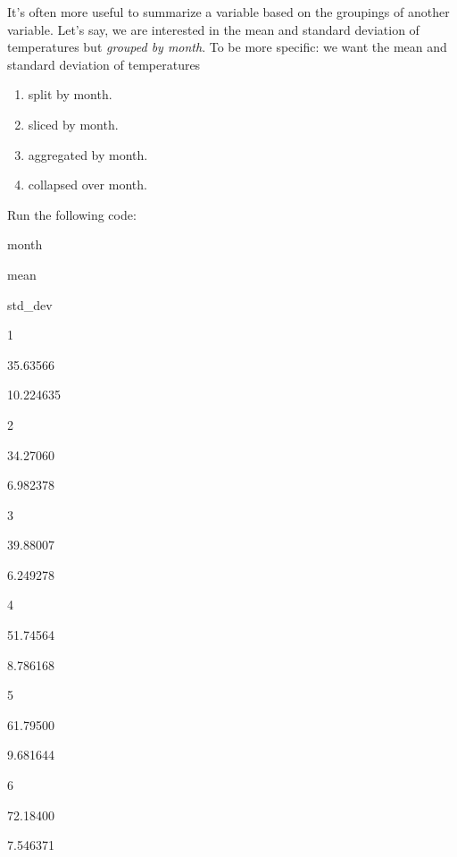 \documentclass[12pt,]{krantz}
\makeatletter
\newenvironment{Shaded}{\begin{snugshade}}{\end{snugshade}}
\newcommand{\KeywordTok}[1]{\textcolor[rgb]{0.27,0.27,0.27}{\textbf{#1}}}
\newcommand{\DataTypeTok}[1]{\textcolor[rgb]{0.27,0.27,0.27}{#1}}
\newcommand{\StringTok}[1]{\textcolor[rgb]{0.5,0.5,0.5}{#1}}
\newcommand{\OtherTok}[1]{\textcolor[rgb]{0.37,0.37,0.37}{#1}}
\newcommand{\OperatorTok}[1]{\textcolor[rgb]{0.43,0.43,0.43}{\textbf{#1}}}
\newcommand{\NormalTok}[1]{#1}
\providecommand{\tightlist}{%
  \setlength{\itemsep}{0pt}\setlength{\parskip}{0pt}}
\newenvironment{kframe}{%
\medskip{}
\setlength{\fboxsep}{.8em}
 \def\at@end@of@kframe{}%
 \ifinner\ifhmode%
  \def\at@end@of@kframe{\end{minipage}}%
  \begin{minipage}{\columnwidth}%
 \fi\fi%
 \def\FrameCommand##1{\hskip\@totalleftmargin \hskip-\fboxsep
 \colorbox{shadecolor}{##1}\hskip-\fboxsep
     \hskip-\linewidth \hskip-\@totalleftmargin \hskip\columnwidth}%
 \MakeFramed {\advance\hsize-\width
   \@totalleftmargin\z@ \linewidth\hsize
   \@setminipage}}%
 {\par\unskip\endMakeFramed%
 \at@end@of@kframe}
\renewenvironment{Shaded}{\begin{kframe}}{\end{kframe}}
\makeatother
\begin{document}
It's often more useful to summarize a variable based on the groupings of
another variable. Let's say, we are interested in the mean and standard
deviation of temperatures but \emph{grouped by month}. To be more
specific: we want the mean and standard deviation of temperatures

\begin{enumerate}
\def\labelenumi{\arabic{enumi}.}
\tightlist
\item
  split by month.
\item
  sliced by month.
\item
  aggregated by month.
\item
  collapsed over month.
\end{enumerate}

Run the following code:

\begin{Shaded}
\end{Shaded}

month

mean

std\_dev

1

35.63566

10.224635

2

34.27060

6.982378

3

39.88007

6.249278

4

51.74564

8.786168

5

61.79500

9.681644

6

72.18400

7.546371
\end{document}
